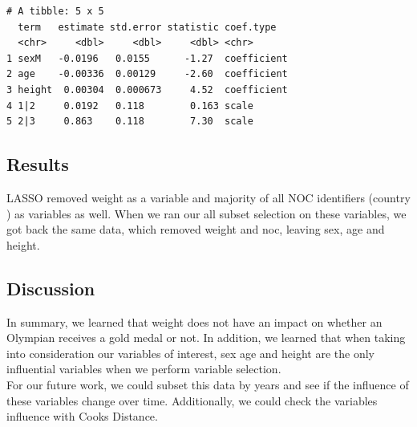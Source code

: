 \documentclass[
  letterpaper,
  DIV=11,
  numbers=noendperiod]{scrartcl}
\begin{document}
\begin{verbatim}
# A tibble: 5 x 5
  term   estimate std.error statistic coef.type  
  <chr>     <dbl>     <dbl>     <dbl> <chr>      
1 sexM   -0.0196   0.0155      -1.27  coefficient
2 age    -0.00336  0.00129     -2.60  coefficient
3 height  0.00304  0.000673     4.52  coefficient
4 1|2     0.0192   0.118        0.163 scale      
5 2|3     0.863    0.118        7.30  scale      
\end{verbatim}

\hypertarget{results}{%
\subsection{Results}\label{results}}

LASSO removed weight as a variable and majority of all NOC identifiers
(country ) as variables as well. When we ran our all subset selection on
these variables, we got back the same data, which removed weight and
noc, leaving sex, age and height.

\hypertarget{discussion}{%
\subsection{Discussion}\label{discussion}}

In summary, we learned that weight does not have an impact on whether an
Olympian receives a gold medal or not. In addition, we learned that when
taking into consideration our variables of interest, sex age and height
are the only influential variables when we perform variable selection.\\
For our future work, we could subset this data by years and see if the
influence of these variables change over time. Additionally, we could
check the variable\textquotesingle s influence with
Cook\textquotesingle s Distance.

\hfill\break
\end{document}
